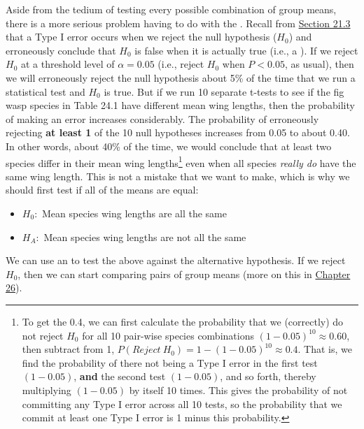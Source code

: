 \documentclass[
  openany]{krantz}
\providecommand{\tightlist}{%
  \setlength{\itemsep}{0pt}\setlength{\parskip}{0pt}}
\begin{document}
Aside from the tedium of testing every possible combination of group means, there is a more serious problem having to do with the .
Recall from \protect\hyperlink{p-values-false-positives-and-power}{Section 21.3} that a Type I error occurs when we reject the null hypothesis (\(H_{0}\)) and erroneously conclude that \(H_{0}\) is false when it is actually true (i.e., a ).
If we reject \(H_{0}\) at a threshold level of \(\alpha = 0.05\) (i.e., reject \(H_{0}\) when \(P < 0.05\), as usual), then we will erroneously reject the null hypothesis about 5\% of the time that we run a statistical test and \(H_{0}\) is true.
But if we run 10 separate t-tests to see if the fig wasp species in Table 24.1 have different mean wing lengths, then the probability of making an error increases considerably.
The probability of erroneously rejecting \textbf{at least 1} of the 10 null hypotheses increases from 0.05 to about 0.40.
In other words, about 40\% of the time, we would conclude that at least two species differ in their mean wing lengths\footnote{To get the 0.4, we can first calculate the probability that we (correctly) do not reject \(H_{0}\) for all 10 pair-wise species combinations \((1 - 0.05)^{10} \approx 0.60\), then subtract from 1, \(P(Reject\:H_{0}) = 1 - (1 - 0.05)^{10} \approx 0.4\). That is, we find the probability of there not being a Type I error in the first test \((1 - 0.05)\), \textbf{and} the second test \((1 - 0.05)\), and so forth, thereby multiplying \((1 - 0.05)\) by itself 10 times. This gives the probability of not committing any Type I error across all 10 tests, so the probability that we commit at least one Type I error is 1 minus this probability.} even when all species \emph{really do} have the same wing length.
This is not a mistake that we want to make, which is why we should first test if all of the means are equal:

\begin{itemize}
\tightlist
\item
  \(H_{0}:\) Mean species wing lengths are all the same
\item
  \(H_{A}:\) Mean species wing lengths are not all the same
\end{itemize}

We can use an  to test the  above against the alternative hypothesis.
If we reject \(H_{0}\), then we can start comparing pairs of group means (more on this in \protect\hyperlink{Chapter_26}{Chapter 26}).
\end{document}
